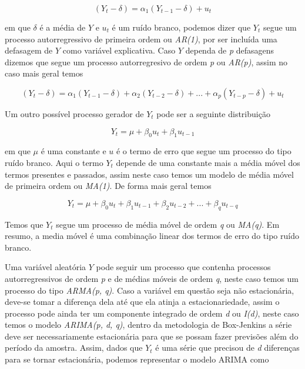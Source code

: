 \documentclass[twocolumn]{rbef}
\newcommand{\1}{\mathbbm{1}}
\begin{document}
\begin{equation}
    (Y_{t} - \delta) = \alpha_{1} (Y_{t-1} - \delta) + u_{t}
\end{equation}

em que $\delta$ é a média de $Y$ e $u_{t}$ é um ruído branco, podemos dizer que $Y_{t}$ segue um processo autorregressivo de primeira ordem ou \textit{AR(1)}, por ser incluída uma defasagem de $Y$ como variável explicativa. Caso $Y$ dependa de \textit{p} defasagens dizemos que segue um processo autorregresivo de ordem \textit{p} ou \textit{AR(p)}, assim no caso mais geral temos

\begin{equation}
    (Y_{t} - \delta) = \alpha_{1} (Y_{t-1} - \delta) + \alpha_{2} (Y_{t-2} - \delta)+ ... + \alpha_{p} (Y_{t-p} - \delta) + u_{t}
\end{equation}

Um outro possível processo gerador de $Y_{t}$ pode ser a seguinte distribuição

\begin{equation}
    Y_{t} = \mu + \beta_{0} u_{t} + \beta_{1} u_{t-1}
\end{equation}

em que $\mu$ é uma constante e $u$ é o termo de erro que segue um processo do tipo ruído branco. Aqui o termo $Y_{t}$ depende de uma constante mais a média móvel dos termos presentes e passados, assim neste caso temos um modelo de média móvel de primeira ordem ou \textit{MA(1)}. De forma mais geral temos

\begin{equation}
    Y_{t} = \mu + \beta_{0} u_{t} + \beta_{1} u_{t-1} + \beta_{2} u_{t-2} + ... + \beta_{q} u_{t-q}
\end{equation}

Temos que $Y_{t}$ segue um processo de média móvel de ordem \textit{q} ou \textit{MA(q)}. Em resumo, a media móvel é uma combinação linear dos termos de erro do tipo ruído branco.

Uma variável aleatória $Y$ pode seguir um processo que contenha processos autorregressivos de ordem \textit{p} e de médias móveis de ordem \textit{q}, neste caso temos um processo do tipo \textit{ARMA(p, q)}. Caso a variável em questão seja não estacionária, deve-se tomar a diferença dela até que ela atinja a estacionariedade, assim o processo pode ainda ter um componente integrado de ordem \textit{d} ou \textit{I(d)}, neste caso temos o modelo \textit{ARIMA(p, d, q)}, dentro da metodologia de Box-Jenkins\cite{Box-Jenkins} a série deve ser necessariamente estacionária para que se possam fazer previsões além do período da amostra. Assim, dados que $Y_{t}$ é uma série que precisou de \textit{d} diferenças para se tornar estacionária, podemos representar o modelo ARIMA como
\end{document}
